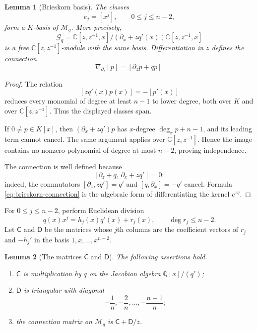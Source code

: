 \documentclass[11pt]{article}
\numberwithin{equation}{section}
\newtheorem{lemma}[lemma]{Lemma}
\theoremstyle{definition}
\theoremstyle{remark}
\newcommand{\C}{\mathbb C}
\newcommand{\Qbar}{\overline{\mathbb Q}}
\newcommand{\Mcal}{\mathcal M}
\begin{document}
\begin{lemma}[Brieskorn basis]\label{lem:Brieskorn-basis}
The classes
\[
  e_j=[x^j],
  \qquad 0\le j\le n-2,
\]
form a $K$-basis of $\Mcal_q$.  More precisely,
\[
  \mathscr G_q
  =\C[z,z^{-1},x]\Big/
  (\partial_x+zq'(x))\C[z,z^{-1},x]
\]
is a free $\C[z,z^{-1}]$-module with the same basis.  Differentiation in $z$ defines the connection
\begin{equation}\label{eq:brieskorn-connection}
  \nabla_{\partial_z}[p]=[\partial_zp+q p].
\end{equation}
\end{lemma}

\begin{proof}
The relation
\[
  [zq'(x)p(x)]=-[p'(x)]
\]
reduces every monomial of degree at least $n-1$ to lower degree, both over $K$ and over $\C[z,z^{-1}]$.  Thus the displayed classes span.

If $0\ne p\in K[x]$, then $(\partial_x+zq')p$ has $x$-degree $\deg_x p+n-1$, and its leading term cannot cancel.  The same argument applies over $\C[z,z^{-1}]$.  Hence the image contains no nonzero polynomial of degree at most $n-2$, proving independence.

The connection is well defined because
\[
  [\partial_z+q,\,\partial_x+zq']=0:
\]
indeed, the commutators $[\partial_z,zq']=q'$ and $[q,\partial_x]=-q'$ cancel.  Formula \eqref{eq:brieskorn-connection} is the algebraic form of differentiating the kernel $e^{zq}$.
\end{proof}

For $0\le j\le n-2$, perform Euclidean division
\begin{equation}\label{eq:division}
  q(x)x^j=h_j(x)q'(x)+r_j(x),
  \qquad \deg r_j\le n-2.
\end{equation}
Let $\mathsf C$ and $\mathsf D$ be the matrices whose $j$th columns are the coefficient vectors of $r_j$ and $-h_j'$ in the basis $1,x,\ldots,x^{n-2}$.

\begin{lemma}[The matrices $\mathsf C$ and $\mathsf D$]\label{lem:CD}
The following assertions hold.
\begin{enumerate}[label=\textup{(\roman*)},leftmargin=2.2em]
\item $\mathsf C$ is multiplication by $q$ on the Jacobian algebra $\Qbar[x]/(q')$;
\item $\mathsf D$ is triangular with diagonal
\[
  -\frac1n,-\frac2n,\ldots,-\frac{n-1}{n};
\]
\item the connection matrix on $\Mcal_q$ is $\mathsf C+\mathsf D/z$.
\end{enumerate}
\end{lemma}
\end{document}
